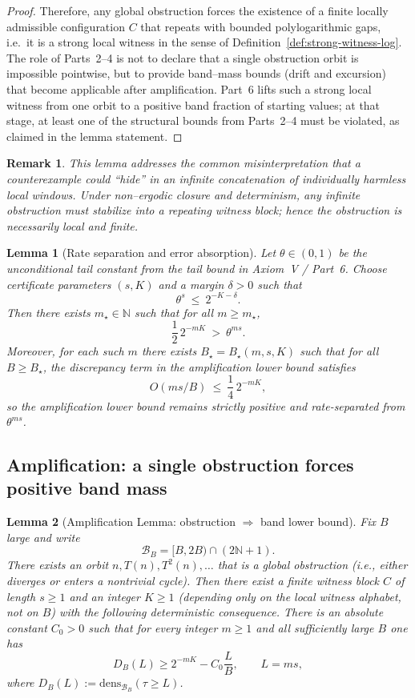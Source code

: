 \documentclass[preprint,12pt]{elsarticle}
\newtheorem{remark}{Remark}
\newtheorem{lemma}{Lemma}
\newcommand{\densB}[2]{\mathrm{dens}_{#1}\!\left(#2\right)}
\begin{document}
\begin{proof}
Therefore, any global obstruction forces the existence of a finite locally admissible configuration $C$
that repeats with bounded polylogarithmic gaps, i.e.\ it is a strong local witness in the sense of
Definition~\ref{def:strong-witness-log}.  The role of Parts~2--4 is not to declare that a single obstruction
orbit is impossible pointwise, but to provide band--mass bounds (drift and excursion) that become applicable
after amplification.  Part~6 lifts such a strong local witness from one orbit to a positive band fraction of
starting values; at that stage, at least one of the structural bounds from Parts~2--4 must be violated, as
claimed in the lemma statement.
\end{proof}

\begin{remark}
This lemma addresses the common misinterpretation that a counterexample could
``hide'' in an infinite concatenation of individually harmless local windows.
Under non--ergodic closure and determinism, any infinite obstruction must
stabilize into a repeating witness block; hence the obstruction is necessarily
local and finite.
\end{remark}

\begin{lemma}[Rate separation and error absorption]
\label{lem:rate_separation_choice}
Let $\theta\in(0,1)$ be the unconditional tail constant from the tail bound in Axiom~V / Part~6.
Choose certificate parameters $(s,K)$ and a margin $\delta>0$ such that
\[
\theta^{s}\ \le\ 2^{-K-\delta}.
\]
Then there exists $m_\star\in\mathbb{N}$ such that for all $m\ge m_\star$,
\[
\frac12\,2^{-mK}\ >\ \theta^{ms}.
\]
Moreover, for each such $m$ there exists $B_\star=B_\star(m,s,K)$ such that for all $B\ge B_\star$,
the discrepancy term in the amplification lower bound satisfies
\[
O(ms/B)\ \le\ \frac14\,2^{-mK},
\]
so the amplification lower bound remains strictly positive and rate-separated from $\theta^{ms}$.
\end{lemma}

\subsection{Amplification: a single obstruction forces positive band mass}
\begin{lemma}[Amplification Lemma: obstruction $\Rightarrow$ band lower bound]
\label{lem:amplification}
Fix $B$ large and write
\[
\mathcal{B}_B=[B,2B)\cap(2\mathbb{N}+1).
\]
There exists an orbit $n, T(n), T^2(n),\dots$ that is a global obstruction
(i.e., either diverges or enters a nontrivial cycle). Then there exist a finite witness block
$C$ of length $s\ge 1$ and an integer $K\ge 1$ (depending only on the local witness alphabet, not on $B$)
with the following deterministic consequence.
There is an absolute constant $C_0>0$ such that for every integer $m\ge 1$
and all sufficiently large $B$ one has
\[
D_B(L)\ge 2^{-mK} - C_0\frac{L}{B},\qquad L=ms,
\]
where \(D_B(L):=\densB{\mathcal{B}_B}{\tau\ge L}\).
\end{lemma}
\end{document}
